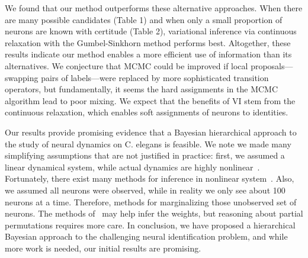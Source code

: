 \documentclass{article}
\begin{document}
We found that our method outperforms these alternative
approaches. When there are many possible candidates (Table 1) and when
only a small proportion of neurons are known with certitude (Table 2),
variational inference via continuous relaxation with the
Gumbel-Sinkhorn method performs best.  Altogether, these results
indicate our method enables a more efficient use of information than
its alternatives. We conjecture that MCMC could be improved if local
proposals---swapping pairs of labels---were replaced by more
sophisticated transition operators, but fundamentally, it seems the
hard assignments in the MCMC algorithm lead to poor mixing.  We expect
that the benefits of VI stem from the continuous relaxation, which
enables soft assignments of neurons to identities.

Our results provide promising evidence that a Bayesian hierarchical
approach to the study of neural dynamics on C. elegans is feasible. We
note we made many simplifying assumptions that are not justified in
practice: first, we assumed a linear dynamical system, while actual
dynamics are highly nonlinear~\citep{Kato2015}. Fortunately, there
exist many methods for inference in nonlinear
system~\citep{Krishnan2015, linderman2017bayesian}. Also, we assumed
all neurons were observed, while in reality we only see about 100
neurons at a time. Therefore, methods for marginalizing those
unobserved set of neurons. The methods of~\citet{Soudry2015} may help
infer the weights, but reasoning about partial permutations requires
more care. In conclusion, we have proposed a hierarchical Bayesian
approach to the challenging neural identification problem, and while
more work is needed, our initial results are promising.

\clearpage



\end{document}
